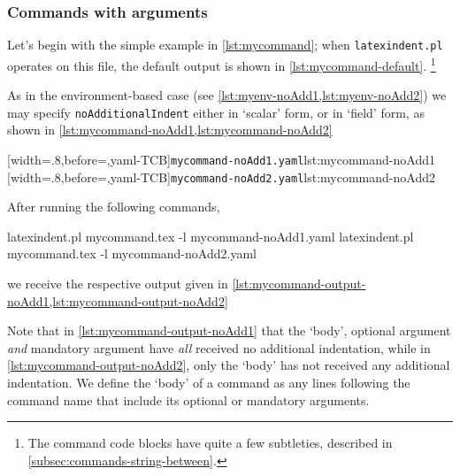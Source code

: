 \documentclass[10pt]{article}
\begin{document}
\subsubsection{Commands with arguments}\label{subsubsec:commands-arguments}
 \begin{example}
 Let's begin with the simple example in \cref{lst:mycommand}; when
 \texttt{latexindent.pl} operates on this file, the default output is shown in
 \cref{lst:mycommand-default}. \footnote{The command code blocks have quite a few
 subtleties, described in \vref{subsec:commands-string-between}.}

 \begin{cmhtcbraster}[raster column skip=.1\linewidth]
 \end{cmhtcbraster}

 As in the environment-based case (see \vref{lst:myenv-noAdd1,lst:myenv-noAdd2}) we may
 specify \texttt{noAdditionalIndent} either in `scalar' form, or in `field' form, as
 shown in \cref{lst:mycommand-noAdd1,lst:mycommand-noAdd2}

 \begin{cmhtcbraster}
  [width=.8\linewidth,before=\centering,yaml-TCB]{\texttt{mycommand-noAdd1.yaml}}{lst:mycommand-noAdd1}
  [width=.8\linewidth,before=\centering,yaml-TCB]{\texttt{mycommand-noAdd2.yaml}}{lst:mycommand-noAdd2}
 \end{cmhtcbraster}

 After running the following commands, 

 \begin{commandshell}
latexindent.pl mycommand.tex -l mycommand-noAdd1.yaml  
latexindent.pl mycommand.tex -l mycommand-noAdd2.yaml  
\end{commandshell}

 we receive the respective output given in
 \cref{lst:mycommand-output-noAdd1,lst:mycommand-output-noAdd2}

 \begin{cmhtcbraster}
 \end{cmhtcbraster}

 Note that in \cref{lst:mycommand-output-noAdd1} that the `body', optional argument
 \emph{and} mandatory argument have \emph{all} received no additional indentation, while
 in \cref{lst:mycommand-output-noAdd2}, only the `body' has not received any additional
 indentation. We define the `body' of a command as any lines following the command name
 that include its optional or mandatory arguments.
 \end{example}
\end{document}
